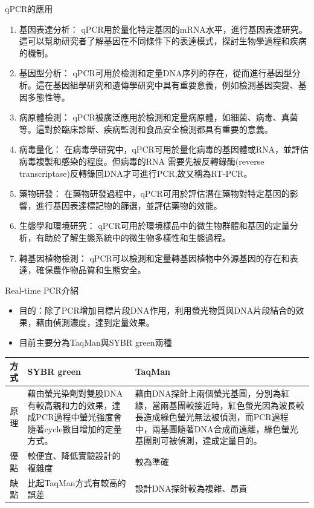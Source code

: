 \dsc qPCR的應用

\begin{enumerate}[label=\arabic*.]
  \item 基因表達分析： qPCR用於量化特定基因的mRNA水平，進行基因表達研究。這可以幫助研究者了解基因在不同條件下的表達模式，探討生物學過程和疾病的機制。
  \item 基因型分析： qPCR可用於檢測和定量DNA序列的存在，從而進行基因型分析。這在基因組學研究和遺傳學研究中具有重要意義，例如檢測基因突變、基因多態性等。
  \item 病原體檢測： qPCR被廣泛應用於檢測和定量病原體，如細菌、病毒、真菌等。這對於臨床診斷、疾病監測和食品安全檢測都具有重要的意義。
  \item 病毒量化： 在病毒學研究中，qPCR可用於量化病毒的基因體或RNA，並評估病毒複製和感染的程度。但病毒的RNA 需要先被反轉錄酶(reverse transcriptase)反轉錄回DNA才可進行PCR,故又稱為RT-PCR。
  \item 藥物研發： 在藥物研發過程中，qPCR可用於評估潛在藥物對特定基因的影響，進行基因表達標記物的篩選，並評估藥物的效能。
  \item 生態學和環境研究： qPCR可用於環境樣品中的微生物群體和基因的定量分析，有助於了解生態系統中的微生物多樣性和生態過程。
  \item 轉基因植物檢測： qPCR可以檢測和定量轉基因植物中外源基因的存在和表達，確保農作物品質和生態安全。
\end{enumerate}

\newpage

\dsc Real-time PCR介紹

\begin{itemize}[leftmargin=0cm,]
  \item[] 目的：除了PCR增加目標片段DNA作用，利用螢光物質與DNA片段結合的效果，藉由偵測濃度，達到定量效果。
  \item[] 目前主要分為TaqMan與SYBR green兩種
\end{itemize}

\begin{table}[h]
\centering
\setlength{\abovecaptionskip}{0cm} %
\begin{tabular}{cp{6cm}p{6cm}}
\toprule
方式&SYBR green&TaqMan\\

\midrule
原理&藉由螢光染劑對雙股DNA有較高親和力的效果，達成PCR過程中螢光強度會隨著cycle數目增加的定量方式。&藉由DNA探針上兩個螢光基團，分別為紅綠，當兩基團較接近時，紅色螢光因為波長較長造成綠色螢光無法被偵測，而PCR過程中，兩基團隨著DNA合成而遠離，綠色螢光基團則可被偵測，達成定量目的。\\
\midrule
優點&較便宜、降低實驗設計的複雜度&較為準確\\
\midrule
缺點&比起TaqMan方式有較高的誤差&設計DNA探針較為複雜、昂貴\\
\bottomrule


\end{tabular}\end{table}





% 
%
